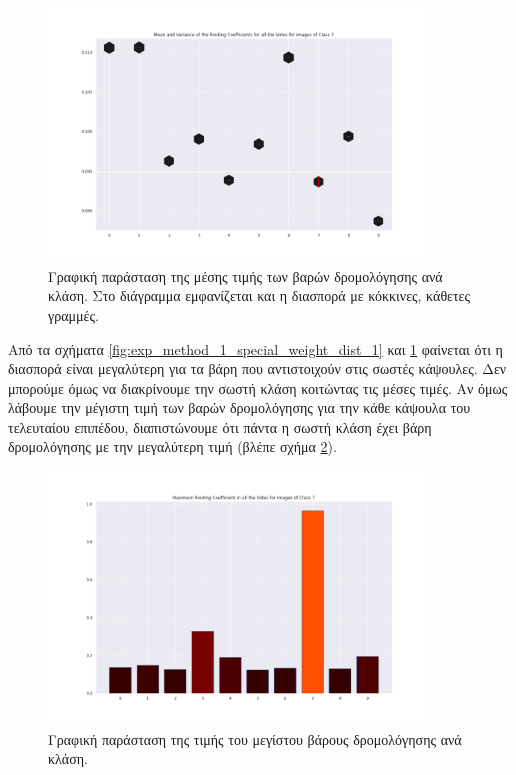 \begin{figure}[h]
    \centering
    \includegraphics[width=0.9\textwidth]{images/chapter experiments/method 1/image 13/mean_var_for_class_7.png}
    \caption{Γραφική παράσταση της μέσης τιμής των βαρών δρομολόγησης ανά κλάση. Στο διάγραμμα εμφανίζεται και η διασπορά με κόκκινες, κάθετες γραμμές.}
    \label{fig:exp_method_1_special_weight_dist_2}
  \end{figure}

Από τα σχήματα \ref{fig:exp_method_1_special_weight_dist_1} και \ref{fig:exp_method_1_special_weight_dist_2} φαίνεται ότι η διασπορά είναι μεγαλύτερη για τα βάρη που αντιστοιχούν στις σωστές κάψουλες. Δεν μπορούμε όμως να διακρίνουμε την σωστή κλάση κοιτώντας τις μέσες τιμές. Αν όμως λάβουμε την μέγιστη τιμή των βαρών δρομολόγησης για την κάθε κάψουλα του τελευταίου επιπέδου, διαπιστώνουμε ότι πάντα η σωστή κλάση έχει βάρη δρομολόγησης με την μεγαλύτερη τιμή (βλέπε σχήμα \ref{fig:exp_method_1_special_weight_dist_3}).
\begin{figure}[h]
    \centering
    \includegraphics[width=0.9\textwidth]{images/chapter experiments/method 1/image 13/Max_for_class_7.png}
    \caption{Γραφική παράσταση της τιμής του μεγίστου βάρους δρομολόγησης ανά κλάση.}
    \label{fig:exp_method_1_special_weight_dist_3}
  \end{figure}

